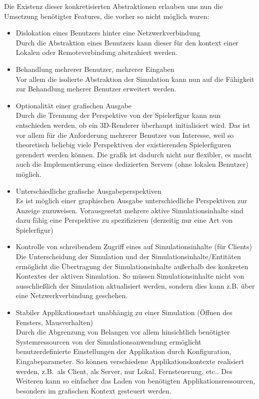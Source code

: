 \documentclass[11pt,twoside,a4paper]{article}
\begin{document}
Die Existenz dieser konkretisierten Abstraktionen erlauben uns nun die Umsetzung benötigter Features, die vorher so nicht möglich waren:
\begin{itemize}
\item Dislokation eines Benutzers hinter eine Netzwerkverbindung\\
	Durch die Abstraktion eines Benutzers kann dieser für den kontext einer Lokalen oder Remoteverbindung abstrahiert werden.
\item Behandlung mehrerer Benutzer, mehrerer Eingaben\\
	Vor allem die isolierte Abstraktion der Simulation kann nun auf die Fähigkeit zur Behandlung meherer Benutzer erweitert werden.
\item Optionalität einer grafischen Ausgabe\\
	Durch die Trennung der Perspektive von der Spielerfigur kann nun entschieden werden, ob ein 3D-Renderer überhaupt initialisiert wird. Das ist vor allem für die Anforderung mehrerer Benutzer von Interesse, weil so theoretisch beliebig viele Perspektiven der existierenden Spielerfiguren gerendert werden können. Die grafik ist dadurch nicht nur flexibler, es macht auch die Implementierung eines dedizierten Servers (ohne lokalen Benutzer) möglich.
\item Unterschiedliche grafische Ausgabeperspektiven\\
	Es ist möglich einer graphischen Ausgabe unterschiedliche Perspektiven zur Anzeige zuzuweisen. Vorausgesetzt mehrere aktive Simulationsinhalte sind dazu fähig eine Perspektive zu spezifizieren (derzeitig nur eine Art von Spielerfigur)
\item Kontrolle von schreibendem Zugriff eines auf Simulationsinhalte (für Clients)\\
Die Unterscheidung der Simulation und der Simulationsinhalte/Entitäten ermöglicht die Übertragung der Simulationsinhalte außerhalb des konkreten Kontextes der aktiven Simulation. So müssen Simulationsinhalte nicht von ausschließlich der Simulation aktualisiert werden, sondern dies kann z.B. über eine Netzwerkverbindung geschehen.
\item Stabiler Applikationsstart unabhängig zu einer Simulation (Öffnen des Fensters, Mausverhalten)\\
	Durch die Abgrenzung von Belangen vor allem hinsichtlich benötigter Systemressourcen von der Simulationsanwendung ermöglicht benutzerdefinierte Einstellungen der Applikation durch Konfiguration, Eingabeparameter.
	So können verschiedene Applikationskontexte realisiert werden, z.B.~als Client, als Server, nur Lokal, Fernsteuerung, etc..
	Des Weiteren kann so einfacher das Laden von benötigten Applikationsressourcen, besonders im grafischen Kontext gesteuert werden.
\end{itemize}
\end{document}
